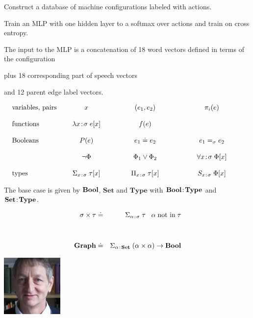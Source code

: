 {

Construct a database of machine configurations labeled with actions.

\vfill
Train an MLP with one hidden layer to a softmax over actions and train on cross entropy.

\vfill
The input to the MLP is a concatenation of 18 word vectors defined in terms of the configuration

\vfill
plus 18 corresponding part of speech vectors

\vfill
and 12 parent edge label vectors.



  $$
  \begin{array}{lccccccc}
    \mbox{variables, pairs} & x & (e_1,e_2) & \pi_i(e) \\ \\
    \mbox{functions} & \lambda \intype{x}{\sigma}\;e[x] & f(e) \\ \\
    \mbox{Booleans} & ~~~~~~~P(e)~~~~~~~ & ~~~~~~~~ e_1 \doteq e_2 ~~~~~~~~ & ~~~~~~~~e_1 =_\sigma e_2 ~~~~~~~~ \\ \\
    & \neg \Phi &  \Phi_1 \vee \Phi_2 & \forall \intype{x}{\sigma}\; \Phi[x] \\ \\
    \mbox{types}   & \Sigma_{\intype{x\;}{\;\sigma}}\;\tau[x] & \Pi_{\intype{x\;}{\;\sigma}}\;\tau[x] & S_{\intype{x\;}{\;\sigma}}\;\Phi[x]
  \end{array}
  $$


The base case is given by $\mathrm{\bf Bool}$, $\mathbf{Set}$ and $\mathbf{Type}$ with $\mathrm{\bf Bool}\!:\!\mathbf{Type}$ and $\mathbf{Set}\!:\!\mathbf{Type}$.


\begin{eqnarray*}
\sigma \times \tau & \doteq & \Sigma_{\alpha\;\!:\!\;\sigma}\;\tau \;\;\;\alpha\;\mbox{not in}\;\tau\\
\\
\\
\mathbf{Graph} & \doteq & \Sigma_{\alpha\;\!:\!\;\mathbf{Set}}\;(\alpha \times \alpha) \rightarrow \mathrm{\bf Bool}
\end{eqnarray*}


\includegraphics[width = 1.2in]{../images/hinton}

}
